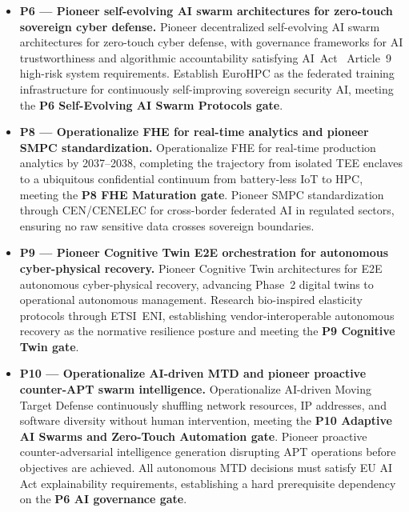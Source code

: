\begin{itemize}
    \item \textbf{P6 --- Pioneer self-evolving AI swarm architectures
    for zero-touch sovereign cyber defense.}
    Pioneer decentralized self-evolving AI swarm architectures for
    zero-touch cyber defense, with governance frameworks for AI
    trustworthiness and algorithmic accountability satisfying
    AI~Act~\cite{aiact} Article~9 high-risk system requirements.
    Establish EuroHPC as the federated training infrastructure for
    continuously self-improving sovereign security AI, meeting the
    \textbf{P6 Self-Evolving AI Swarm Protocols gate}.

    \item \textbf{P8 --- Operationalize FHE for real-time analytics
    and pioneer SMPC standardization.}
    Operationalize FHE for real-time production analytics by
    2037--2038, completing the trajectory from isolated TEE enclaves
    to a ubiquitous confidential continuum from battery-less IoT to
    HPC, meeting the \textbf{P8 FHE Maturation gate}. Pioneer SMPC
    standardization through CEN/CENELEC for cross-border federated AI
    in regulated sectors, ensuring no raw sensitive data crosses
    sovereign boundaries.

    \item \textbf{P9 --- Pioneer Cognitive Twin E2E orchestration for
    autonomous cyber-physical recovery.}
    Pioneer Cognitive Twin architectures for E2E autonomous
    cyber-physical recovery, advancing Phase~2 digital twins to
    operational autonomous management. Research bio-inspired elasticity
    protocols through ETSI~ENI, establishing vendor-interoperable
    autonomous recovery as the normative resilience posture and meeting
    the \textbf{P9 Cognitive Twin gate}.

    \item \textbf{P10 --- Operationalize AI-driven MTD and pioneer
    proactive counter-APT swarm intelligence.}
    Operationalize AI-driven Moving Target Defense continuously
    shuffling network resources, IP addresses, and software diversity
    without human intervention, meeting the \textbf{P10 Adaptive
    AI Swarms and Zero-Touch Automation gate}. Pioneer proactive
    counter-adversarial intelligence generation disrupting APT
    operations before objectives are achieved. All autonomous MTD
    decisions must satisfy EU AI Act explainability requirements,
    establishing a hard prerequisite dependency on the
    \textbf{P6 AI governance gate}.

\end{itemize}

